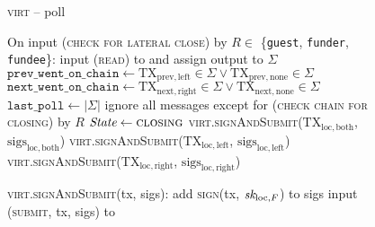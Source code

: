 \begin{figure}[H]
  \begin{processbox}{\textsc{virt} -- poll}
    \begin{algorithmic}[1]
      \State On input (\textsc{check for lateral close}) by $R \in$
      \{\texttt{guest}, \texttt{funder}, \texttt{fundee}\}:
      \Indent
        \State input (\textsc{read}) to \ledger and assign output to $\Sigma$
        \State $\texttt{prev\_went\_on\_chain} \gets \mathrm{TX}_{\mathrm{prev},
        \mathrm{left}} \in \Sigma \vee \mathrm{TX}_{\mathrm{prev},
        \mathrm{none}} \in \Sigma$
        \State $\texttt{next\_went\_on\_chain} \gets \mathrm{TX}_{\mathrm{next},
        \mathrm{right}} \in \Sigma \vee \mathrm{TX}_{\mathrm{next},
        \mathrm{none}} \in \Sigma$
        \State $\texttt{last\_poll} \gets |\Sigma|$
          \State ignore all messages except for (\textsc{check chain for
          closing}) by $R$
          \State $\textit{State} \gets \textsc{closing}$
        \EndIf
          \State
          \textsc{virt}.\textsc{signAndSubmit}($\mathrm{TX}_{\mathrm{loc},
          \mathrm{both}}$, $\mathrm{sigs}_{\mathrm{loc}, \mathrm{both}}$)
          \State
          \textsc{virt}.\textsc{signAndSubmit}($\mathrm{TX}_{\mathrm{loc},
          \mathrm{left}}$, $\mathrm{sigs}_{\mathrm{loc}, \mathrm{left}}$)
          \State
          \textsc{virt}.\textsc{signAndSubmit}($\mathrm{TX}_{\mathrm{loc},
          \mathrm{right}}$, $\mathrm{sigs}_{\mathrm{loc}, \mathrm{right}}$)
        \EndIf
      \EndIndent
      \Statex

      \State \textsc{virt}.\textsc{signAndSubmit}(tx, sigs):
      \Indent
        \State add \textsc{sign}(tx, $\textit{sk}_{\mathrm{loc}, F}$) to sigs
        \State input (\textsc{submit}, tx, sigs) to \ledger
      \EndIndent
    \end{algorithmic}
  \end{processbox}
  \caption{}
  \label{code:virtual-layer:poll}
\end{figure}


